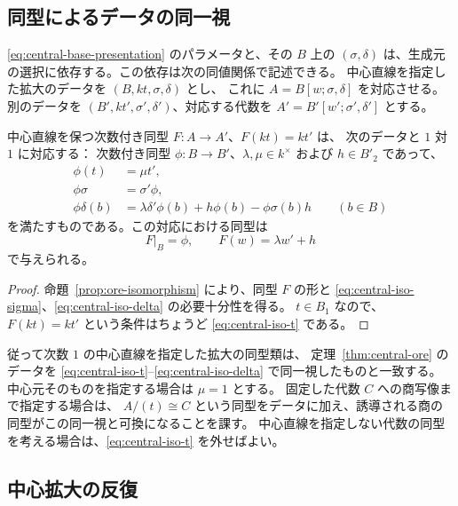 \subsection{同型によるデータの同一視}

\eqref{eq:central-base-presentation} のパラメータと、その $B$ 上の
$(\sigma,\delta)$ は、生成元の選択に依存する。この依存は次の同値関係で記述できる。
中心直線を指定した拡大のデータを $(B,kt,\sigma,\delta)$ とし、
これに $A=B[w;\sigma,\delta]$ を対応させる。
別のデータを $(B',kt',\sigma',\delta')$、対応する代数を
$A'=B'[w';\sigma',\delta']$ とする。

\begin{proposition}\label{prop:central-isomorphisms}
中心直線を保つ次数付き同型 $F:A\to A'$、$F(kt)=kt'$ は、
次のデータと $1$ 対 $1$ に対応する：
次数付き同型 $\phi:B\to B'$、$\lambda,\mu\in k^\times$ および $h\in B'_2$ であって、
\begin{align}
  \phi(t)&=\mu t',\label{eq:central-iso-t}\\
  \phi\sigma&=\sigma'\phi,\label{eq:central-iso-sigma}\\
  \phi\delta(b)&=\lambda\delta'\phi(b)+h\phi(b)-\phi\sigma(b)h
       \qquad(b\in B)\label{eq:central-iso-delta}
\end{align}
を満たすものである。この対応における同型は
\[
  F|_B=\phi,\qquad F(w)=\lambda w'+h
\]
で与えられる。
\end{proposition}

\begin{proof}
命題~\ref{prop:ore-isomorphism} により、同型 $F$ の形と
\eqref{eq:central-iso-sigma}、\eqref{eq:central-iso-delta} の必要十分性を得る。
$t\in B_1$ なので、$F(kt)=kt'$ という条件はちょうど
\eqref{eq:central-iso-t} である。
\end{proof}

従って次数 $1$ の中心直線を指定した拡大の同型類は、
定理~\ref{thm:central-ore} のデータを
\eqref{eq:central-iso-t}--\eqref{eq:central-iso-delta} で同一視したものと一致する。
中心元そのものを指定する場合は $\mu=1$ とする。
固定した代数 $C$ への商写像まで指定する場合は、
$A/(t)\cong C$ という同型をデータに加え、誘導される商の同型がこの同一視と可換になることを課す。
中心直線を指定しない代数の同型を考える場合は、\eqref{eq:central-iso-t} を外せばよい。

\subsection{中心拡大の反復}

